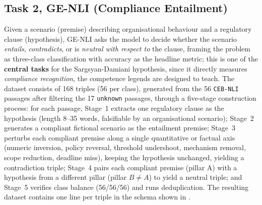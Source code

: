 \documentclass[pdflatex, sn-apa]{sn-jnl}%
\theoremstyle{thmstyleone}%
\theoremstyle{thmstyletwo}%
\theoremstyle{thmstylethree}%
\begin{document}
\subsection{Task 2, GE-NLI (Compliance Entailment)}
\label{sec:bench:nli}
Given a scenario (premise) describing organisational behaviour and a regulatory
clause (hypothesis), GE-NLI asks the model to decide whether the scenario
\emph{entails}, \emph{contradicts}, or is \emph{neutral with respect to} the
clause, framing the problem as three-class classification with accuracy as the
headline metric; this is one of the \textbf{central tasks} for the
Sargsyan-Damiani hypothesis, since it directly measures \emph{compliance
recognition}, the competence legends are designed to teach. The dataset consists
of 168 triples (56 per class), generated from the 56 \texttt{CEB-NLI} passages
after filtering the 17 \texttt{unknown} passages, through a five-stage
construction process: for each passage, Stage~1 extracts one regulatory clause
as the hypothesis (length 8--35 words, falsifiable by an organisational
scenario); Stage~2 generates a compliant fictional scenario as the entailment
premise; Stage~3 perturbs each compliant premise along a single quantitative or
factual axis (numeric inversion, policy reversal, threshold undershoot,
mechanism removal, scope reduction, deadline miss), keeping the hypothesis
unchanged, yielding a contradiction triple; Stage~4 pairs each compliant premise
(pillar A) with a hypothesis from a different pillar (pillar $B\neq A$) to yield
a neutral triple; and Stage~5 verifies class balance (56/56/56) and runs
deduplication. The resulting dataset contains one line per triple in the schema
shown in .



\end{document}
